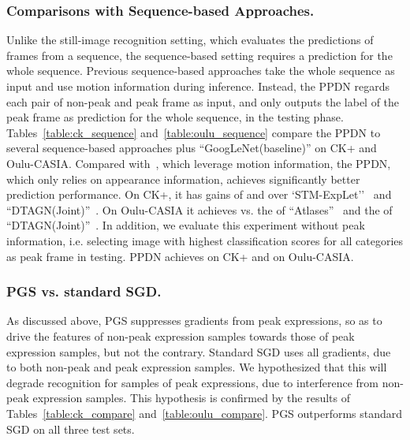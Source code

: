 \documentclass[runningheads]{llncs}
\begin{document}
\subsubsection{Comparisons with Sequence-based Approaches.} Unlike the 
still-image recognition setting, which evaluates the predictions of frames 
from a sequence, the sequence-based setting requires a prediction for the
whole sequence. Previous sequence-based approaches take the whole sequence 
as input and use motion information during inference. Instead, the PPDN 
regards each pair of non-peak and peak frame as input, and only outputs
the label of the peak frame as prediction for the whole sequence, in the 
testing phase. Tables~\ref{table:ck_sequence} and~\ref{table:oulu_sequence} compare
the PPDN to several sequence-based approaches plus ``GoogLeNet(baseline)'' 
on CK+ and Oulu-CASIA. Compared with~\cite{liu2014learning,liu2014deeply,jung2015joint}, which leverage motion information, the PPDN, which only relies on  
appearance information, achieves significantly better prediction performance.
On CK+, it has gains of  and  over 
`STM-ExpLet''~\cite{liu2014learning} and 
``DTAGN(Joint)''~\cite{jung2015joint}. On Oulu-CASIA it achieves
 vs. the  of ``Atlases''~\cite{guo2012dynamic} and 
the  of ``DTAGN(Joint)''~\cite{jung2015joint}. In addition, we evaluate this experiment without peak information, i.e. selecting image with highest classification scores for all categories as peak frame in testing. PPDN achieves  on CK+ and  on Oulu-CASIA.

\subsubsection{PGS vs. standard SGD.} As discussed above, PGS suppresses gradients
from peak expressions, so as to drive the features of non-peak 
expression samples towards those of peak expression samples, but not the
contrary. Standard SGD uses all gradients, due to both non-peak and peak 
expression samples. We hypothesized that this will degrade recognition 
for samples of peak expressions, due to interference from non-peak 
expression samples. This hypothesis is confirmed by the results
of Tables~\ref{table:ck_compare} and~\ref{table:oulu_compare}. 
PGS outperforms standard SGD on all three test sets.
\end{document}
